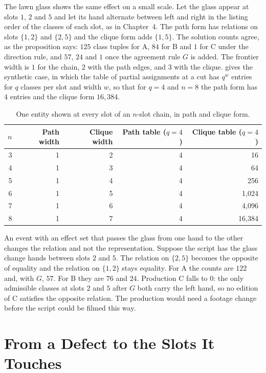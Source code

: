 \documentclass[11pt,twoside,openright]{book}
\theoremstyle{plain}
\theoremstyle{definition}
\theoremstyle{remark}
\begin{document}
The lawn glass shows the same effect on a small scale. Let the glass appear at slots $1$, $2$ and $5$ and let its hand alternate between left and right in the listing order of the classes of each slot, as in Chapter~4. The path form has relations on slots $\{1,2\}$ and $\{2,5\}$ and the clique form adds $\{1,5\}$. The solution counts agree, as the proposition says: $125$ class tuples for A, $84$ for B and $1$ for C under the direction rule, and $57$, $24$ and $1$ once the agreement rule $G$ is added. The frontier width is $1$ for the chain, $2$ with the path edges, and $3$ with the clique.  gives the synthetic case, in which the table of partial assignments at a cut has $q^{w}$ entries for $q$ classes per slot and width $w$, so that for $q=4$ and $n=8$ the path form has $4$ entries and the clique form $16{,}384$.

\begin{table}[ht]
\centering
\begin{tabular}{@{}rrrrr@{}}
\toprule
$n$ & Path width & Clique width & Path table ($q=4$) & Clique table ($q=4$)\\
\midrule
3 & 1 & 2 & 4 & 16\\
4 & 1 & 3 & 4 & 64\\
5 & 1 & 4 & 4 & 256\\
6 & 1 & 5 & 4 & 1,024\\
7 & 1 & 6 & 4 & 4,096\\
8 & 1 & 7 & 4 & 16,384\\
\bottomrule
\end{tabular}
\caption{One entity shown at every slot of an $n$-slot chain, in path and clique form.}\label{tab:widths}
\end{table}

An event with an effect set that passes the glass from one hand to the other changes the relation and not the representation. Suppose the script has the glass change hands between slots $2$ and $5$. The relation on $\{2,5\}$ becomes the opposite of equality and the relation on $\{1,2\}$ stays equality. For A the counts are $122$ and, with $G$, $57$. For B they are $76$ and $24$. Production C falls to $0$: the only admissible classes at slots $2$ and $5$ after $G$ both carry the left hand, so no edition of C satisfies the opposite relation. The production would need a footage change before the script could be filmed this way.

\section{From a Defect to the Slots It Touches}\label{sec:defects}
\end{document}
